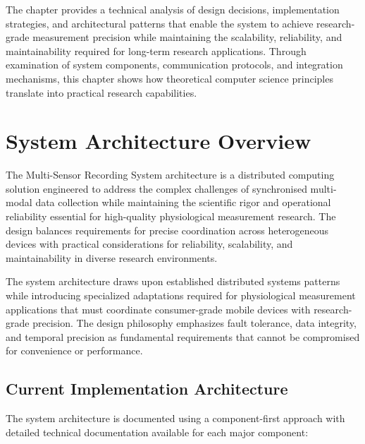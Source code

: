 \documentclass[11pt,a4paper]{report}
\begin{document}
The chapter provides a technical analysis of design decisions, implementation strategies, and architectural patterns that enable the system to achieve research-grade measurement precision while maintaining the scalability, reliability, and maintainability required for long-term research applications. Through examination of system components, communication protocols, and integration mechanisms, this chapter shows how theoretical computer science principles translate into practical research capabilities.

\section{System Architecture Overview}

The Multi-Sensor Recording System architecture is a distributed computing solution engineered to address the complex challenges of synchronised multi-modal data collection while maintaining the scientific rigor and operational reliability essential for high-quality physiological measurement research. The design balances requirements for precise coordination across heterogeneous devices with practical considerations for reliability, scalability, and maintainability in diverse research environments.

The system architecture draws upon established distributed systems patterns while introducing specialized adaptations required for physiological measurement applications that must coordinate consumer-grade mobile devices with research-grade precision. The design philosophy emphasizes fault tolerance, data integrity, and temporal precision as fundamental requirements that cannot be compromised for convenience or performance.

\subsection{Current Implementation Architecture}

The system architecture is documented using a component-first approach with detailed technical documentation available for each major component:
\end{document}
